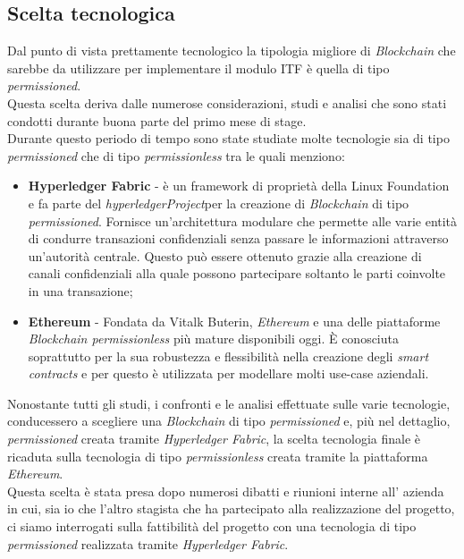 \subsection{Scelta tecnologica}
Dal punto di vista prettamente tecnologico la tipologia migliore di \textit{Blockchain} che sarebbe da utilizzare per implementare il modulo \gls{ITF} è quella di tipo \textit{permissioned}.\\
Questa scelta deriva dalle numerose considerazioni, studi e analisi che sono stati condotti durante buona parte del primo mese di stage.\\
Durante questo periodo di tempo sono state studiate molte tecnologie sia di tipo \textit{permissioned} che di tipo \textit{permissionless} tra le quali menziono:
\begin{itemize}
	\item \textbf{Hyperledger Fabric} - è un framework di proprietà della Linux Foundation\cite{linuxFoundation} e fa parte del \emph{\gls{hyperledgerProject}}\glsfirstoccur per la creazione di \textit{Blockchain} di tipo \textit{permissioned}. Fornisce un'architettura modulare che permette alle varie entità di condurre transazioni confidenziali senza passare le informazioni attraverso un'autorità centrale. Questo può essere ottenuto grazie alla creazione di canali confidenziali alla quale possono partecipare soltanto le parti coinvolte in una transazione;
	\item \textbf{Ethereum} - Fondata da Vitalk Buterin, \textit{Ethereum} e una delle piattaforme \textit{Blockchain permissionless} più mature disponibili oggi.
	È conosciuta soprattutto per la sua robustezza e flessibilità nella creazione degli \textit{smart contracts} e per questo è utilizzata per modellare molti use-case aziendali\cite{ethereumProject}.
\end{itemize}
Nonostante tutti gli studi, i confronti e le analisi effettuate sulle varie tecnologie, conducessero a scegliere una \textit{Blockchain} di tipo \textit{permissioned} e, più nel dettaglio, \textit{permissioned} creata tramite \textit{Hyperledger Fabric}, la scelta tecnologia finale è ricaduta sulla tecnologia di tipo \textit{permissionless} creata tramite la piattaforma \textit{Ethereum}.\\
Questa scelta è stata presa dopo numerosi dibatti e riunioni interne all' azienda in cui, sia io che l'altro stagista che ha partecipato alla realizzazione del progetto, ci siamo interrogati sulla fattibilità del progetto con una tecnologia di tipo \textit{permissioned} realizzata tramite \textit{Hyperledger Fabric}.\\
